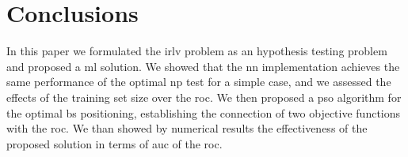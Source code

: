 \documentclass[conference]{IEEEtran}
\begin{document}
\section{Conclusions}
\label{sec:conc}

In this paper we formulated the \ac{irlv} problem as an hypothesis testing problem and  proposed a \ac{ml}  solution. We showed that the \ac{nn} implementation achieves the same performance of the optimal  \ac{np} test for a simple case, and we assessed the effects of the training set size over the \ac{roc}. We then proposed a \ac{pso}  algorithm for the  optimal \ac{bs} positioning, establishing the connection of two objective functions with the \ac{roc}. We than showed by numerical results the effectiveness of the proposed solution in terms of \ac{auc} of the \ac{roc}.


\renewcommand*{\bibfont}{\footnotesize}

\printbibliography
\end{document}
